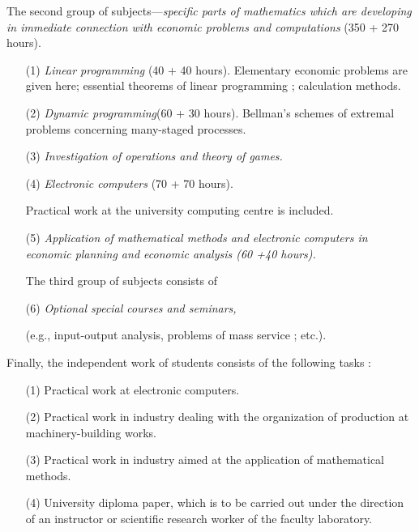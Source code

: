 The second group of subjects---\textit{specific parts of mathematics
  which are developing in immediate connection with economic problems
  and computations} (350 + 270  hours).
\begin{itemize}
\item[(1)] \textit{Linear programming} (40 + 40 hours). Elementary
  economic problems are given here; essential theorems of linear
  programming ; calculation methods. 

\item[(2)] \textit{Dynamic programming}\pageoriginale (60 + 30 hours). Bellman's
  schemes of extremal problems concerning many-staged processes.

\item[(3)] \textit{Investigation of operations and theory of games.}

\item[(4)] \textit{Electronic computers} (70 + 70 hours).

Practical work at the university computing centre is included.

\item[(5)] \textit{Application of mathematical methods and electronic
  computers in economic planning and economic analysis (60 +40 hours).}

The third group of subjects consists of 

\item[(6)] \textit{Optional special courses and seminars,}

(e.g., input-output analysis, problems of mass service ; etc.).
\end{itemize}

Finally, the independent work of students consists of the following
tasks :
\begin{itemize}
\item[(1)] Practical work at electronic computers.

\item[(2)] Practical work in industry dealing with the organization of
  production at machinery-building works.

\item[(3)] Practical work in industry aimed at the application of
  mathematical methods. 

\item[(4)] University diploma paper, which is to be carried out under
  the direction of an instructor or scientific research worker of the
  faculty laboratory.
\end{itemize}

